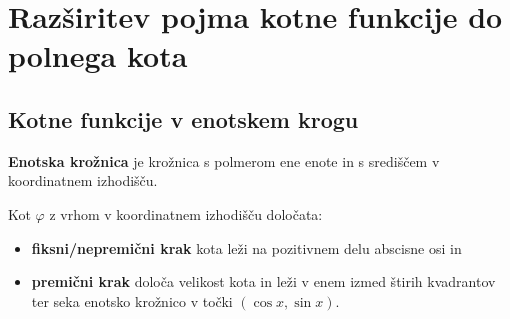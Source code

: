         







    \section{Razširitev pojma kotne funkcije do polnega kota}


        
            \subsection{Kotne funkcije v enotskem krogu}

            
            
                    
                        \textbf{Enotska krožnica} je krožnica s polmerom ene enote in s središčem v koordinatnem izhodišču.
                    

                    
                        Kot $\varphi$ z vrhom v koordinatnem izhodišču določata:
                        \begin{itemize}
                            \item \textbf{fiksni/nepremični krak} kota leži na pozitivnem delu abscisne osi in
                            \item \textbf{premični krak} določa velikost kota in leži v enem izmed štirih kvadrantov ter seka enotsko krožnico v točki $(\cos{x},\sin{x})$.
                        \end{itemize}
                    

